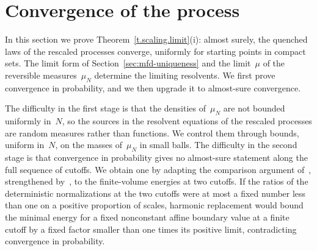 \documentclass[11pt]{amsart}
\begin{document}
\section{Convergence of the process}
\label{sec:mfd-process-convergence}

In this section we prove Theorem~\ref{t.scaling.limit}(i): almost surely, the quenched laws of the rescaled processes converge, uniformly for starting points in compact sets. The limit form of Section~\ref{sec:mfd-uniqueness} and the limit~$\mu$ of the reversible measures~$\mu_N$ determine the limiting resolvents. We first prove convergence in probability, and we then upgrade it to almost-sure convergence.

\smallskip

The difficulty in the first stage is that the densities of~$\mu_N$ are not bounded uniformly in~$N$, so the sources in the resolvent equations of the rescaled processes are random measures rather than functions. We control them through bounds, uniform in~$N$, on the masses of~$\mu_N$ in small balls. The difficulty in the second stage is that convergence in probability gives no almost-sure statement along the full sequence of cutoffs. We obtain one by adapting the comparison argument of~\citet[Section~3.4]{DGComparison}, strengthened by~\citet[Lemma~3.11]{Devlin2024}, to the finite-volume energies at two cutoffs. If the ratios of the deterministic normalizations at the two cutoffs were at most a fixed number less than one on a positive proportion of scales, harmonic replacement would bound the minimal energy for a fixed nonconstant affine boundary value at a finite cutoff by a fixed factor smaller than one times its positive limit, contradicting convergence in probability.

\smallskip
\end{document}

